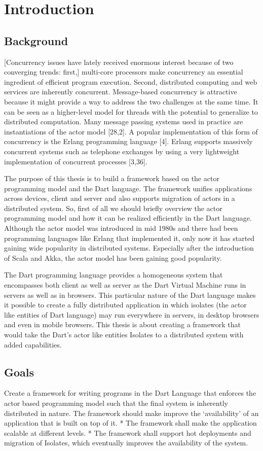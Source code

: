 \chapter{Introduction}\label{chapter:introduction}

\section{Background}
[Concurrency issues have lately received enormous interest because of two converging trends: first,] multi-core processors make concurrency an essential ingredient of efficient program execution. Second, distributed computing and web services are inherently concurrent. Message-based concurrency is attractive because it might provide a way to address the two challenges at the same time. It can be seen as a higher-level model for threads with the potential to generalize to distributed computation. Many message passing systems used in practice are instantiations of the actor model [28,2]. A popular implementation of this form of concurrency is the Erlang programming language [4]. Erlang supports massively concurrent systems such as telephone exchanges by using a very lightweight implementation of concurrent processes [3,36].~\parencite{Haller}

  The purpose of this thesis is to build a framework based on the actor programming model and the Dart language. The framework unifies applications across devices, client and server and also supports migration of actors in a distributed system. So, first of all we should briefly overview the actor programming model and how it can be realized efficiently in the Dart language. Although the actor model was introduced in mid 1980s and there had been programming languages like Erlang that implemented it, only now it has started gaining wide popularity in distributed systems. Especially after the introduction of Scala and Akka, the actor model has been gaining good popularity.

  The Dart programming language provides a homogeneous system that encompasses both client as well as server as the Dart Virtual Machine runs in servers as well as in browsers. This particular nature of the Dart language makes it possible to create a fully distributed application in which isolates (the actor like entities of Dart language) may run everywhere \textemdash{} in servers, in desktop browsers and even in mobile browsers.
This thesis is about creating a framework that would take the Dart's actor like entities \textemdash{} Isolates to a distributed system with added capabilities.

\section{Goals}
  Create a framework for writing programs in the Dart Language that enforces the actor based programming model such that the final system is inherently distributed in nature.
The framework should make improve the ‘availability’ of an application that is built on top of it.
* The framework shall make the application scalable at different levels.
* The framework shall support hot deployments and migration of Isolates, which eventually improves the availability of the system.
